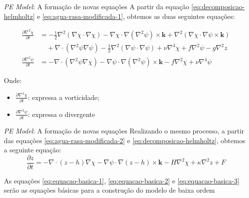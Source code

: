 \begin{frame}{\textit{PE Model}: A formação de novas equações}
   A partir da equação \eqref{eq:decomposicao-helmholtz} e \eqref{eq:agua-rasa-modificada-1}, obtemos as duas seguintes equações:
   \begin{small}
       \begin{align}
           \frac{\partial \nabla^2 \chi}{\partial t} &= -\frac{1}{2}\nabla^2(\nabla \chi \cdot \nabla \chi) - \nabla \chi \cdot \nabla(\nabla^2\psi) \times \mathbf{k} + \nabla^2(\nabla \chi \cdot \nabla \psi \times \mathbf{k}) \nonumber \\
           &\quad + \nabla \cdot (\nabla^2\psi\nabla\psi) - \frac{1}{2}\nabla^2(\nabla \psi \cdot \nabla \psi) + \nu\nabla^4\chi + f\nabla^2\psi - g\nabla^2z \label{eq:equacao-basica-1} \\
           \frac{\partial \nabla^2 \psi}{\partial t} &= -\nabla \cdot (\nabla^2\psi\nabla \chi) - \nabla \psi \cdot \nabla(\nabla^2\psi) \times \mathbf{k} - f\nabla^2\chi + \nu\nabla^4\psi\label{eq:equacao-basica-2}
       \end{align}
   \end{small}

   Onde:
   \begin{itemize}
       \item $\frac{\partial \nabla^2 \chi}{\partial t}$: expressa a vorticidade;
       \item $\frac{\partial \nabla^2 \psi}{\partial t}$: expressa o divergente
   \end{itemize}
\end{frame}

\begin{frame}{\textit{PE Model}: A formação de novas equações}
   Realizando o mesmo processo, a partir das equações \eqref{eq:agua-rasa-modificada-2} e \eqref{eq:decomposicao-helmholtz}, obtemos a seguinte equação:
    \begin{equation}
        \frac{\partial z}{\partial t} = -\nabla \cdot (z - h)\nabla \chi - \nabla \psi \cdot \nabla(z - h) \times \mathbf{k} - H\nabla^2\chi + \kappa\nabla^2z + F \label{eq:equacao-basica-3}
    \end{equation}

    As equações \eqref{eq:equacao-basica-1}, \eqref{eq:equacao-basica-2} e \eqref{eq:equacao-basica-3} serão as equações básicas para a construção do modelo de baixa ordem
\end{frame}
